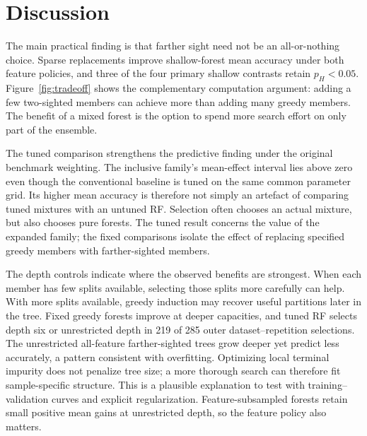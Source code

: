\documentclass[final,5p,times]{elsarticle}
\begin{document}
\section{Discussion}

The main practical finding is that farther sight need not be an all-or-nothing
choice. Sparse replacements improve shallow-forest mean accuracy under both
feature policies, and three of the four primary shallow contrasts retain
$p_H<0.05$. Figure~\ref{fig:tradeoff} shows the complementary computation
argument: adding a few two-sighted members can achieve more than adding many
greedy members. The benefit of a mixed forest is the option to spend more
search effort on only part of the ensemble.

The tuned comparison strengthens the predictive finding under the original
benchmark weighting. The inclusive
family's mean-effect interval lies above zero even though the conventional
baseline is tuned on the same common parameter grid. Its higher mean
accuracy is therefore not simply an artefact of comparing tuned mixtures
with an untuned RF. Selection often chooses an actual mixture, but also
chooses pure forests. The tuned result concerns the value of the expanded
family; the fixed comparisons isolate the effect of replacing specified
greedy members with farther-sighted members.

The depth controls indicate where the observed benefits are strongest. When each
member has few splits available, selecting those splits more carefully can
help. With more splits available, greedy induction may recover useful
partitions later in the tree. Fixed greedy forests improve at deeper
capacities, and tuned RF selects depth six or unrestricted depth in 219 of
285 outer dataset--repetition selections. The unrestricted all-feature farther-sighted trees grow deeper
yet predict less accurately, a pattern consistent with overfitting.
Optimizing local terminal impurity does not penalize tree size; a more
thorough search can therefore fit sample-specific structure. This is a
plausible explanation to test with training--validation curves and explicit
regularization. Feature-subsampled forests retain small positive mean gains
at unrestricted depth, so the feature policy also matters.
\end{document}
